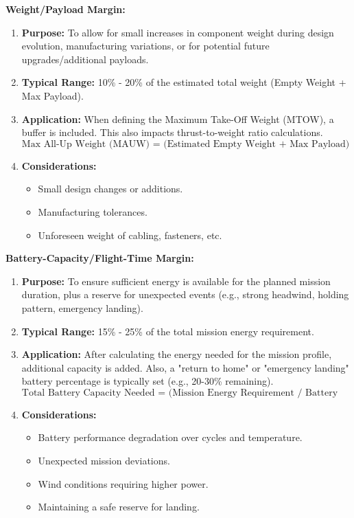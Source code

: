 \documentclass[12pt]{report}
\begin{document}
        \noindent \textbf{\large Weight/Payload Margin:} \\
        \begin{enumerate}
          \item \textbf{Purpose:} To allow for small increases in component weight during design evolution, manufacturing variations, or for potential future upgrades/additional payloads.
          \item \textbf{Typical Range:} 10\% - 20\% of the estimated total weight (Empty Weight + Max Payload).
          \item \textbf{Application:} When defining the Maximum Take-Off Weight (MTOW), a buffer is included. This also impacts thrust-to-weight ratio calculations. \[ \text{Max All-Up Weight (MAUW) = (Estimated Empty Weight + Max Payload) * (1 + Weight Margin)} \]
          \item \textbf{Considerations:}
            \begin{itemize}
              \item Small design changes or additions.
              \item Manufacturing tolerances.
              \item Unforeseen weight of cabling, fasteners, etc.
            \end{itemize}
        \end{enumerate}
        \noindent \textbf{\large Battery-Capacity/Flight-Time Margin:} \\
        \begin{enumerate}
          \item \textbf{Purpose:} To ensure sufficient energy is available for the planned mission duration, plus a reserve for unexpected events (e.g., strong headwind, holding pattern, emergency landing).
          \item \textbf{Typical Range:} 15\% - 25\% of the total mission energy requirement.
          \item \textbf{Application:} After calculating the energy needed for the mission profile, additional capacity is added. Also, a "return to home" or "emergency landing" battery percentage is typically set (e.g., 20-30\% remaining). \[ \text{Total Battery Capacity Needed = (Mission Energy Requirement / Battery Discharge Efficiency) * (1 + Capacity Margin)} \]
          \item \textbf{Considerations:}
            \begin{itemize}
              \item Battery performance degradation over cycles and temperature.
              \item Unexpected mission deviations.
              \item Wind conditions requiring higher power.
              \item Maintaining a safe reserve for landing.
            \end{itemize}
        \end{enumerate}
\end{document}
